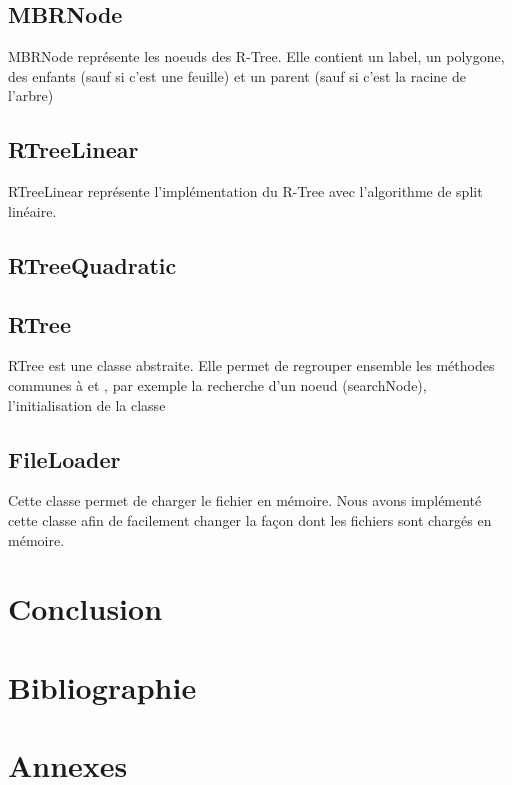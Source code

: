 \documentclass[utf8]{article}
\begin{document}
\begin{large}
\par
\subsection{MBRNode}
MBRNode représente les noeuds des R-Tree. Elle contient un label, un polygone,
des enfants (sauf si c'est une feuille) et un parent (sauf si c'est la racine de
l'arbre)

\subsection{RTreeLinear}
\label{RTreeLinear}

RTreeLinear représente l'implémentation du R-Tree avec l'algorithme de split linéaire.
\subsection{RTreeQuadratic}
\label{RTreeQuadratic}

\subsection{RTree}

RTree est une classe abstraite. Elle permet de regrouper ensemble les méthodes
communes à  et , par exemple la
recherche d'un noeud (searchNode), l'initialisation de la classe


\subsection{FileLoader}

Cette classe permet de charger le fichier en mémoire. Nous avons implémenté
cette classe afin de facilement changer la façon dont les fichiers sont chargés
en mémoire.

\section{Conclusion}
\indent
\par
\par

\section{Bibliographie}

\section{Annexes}

\end{large}
\end{document}
